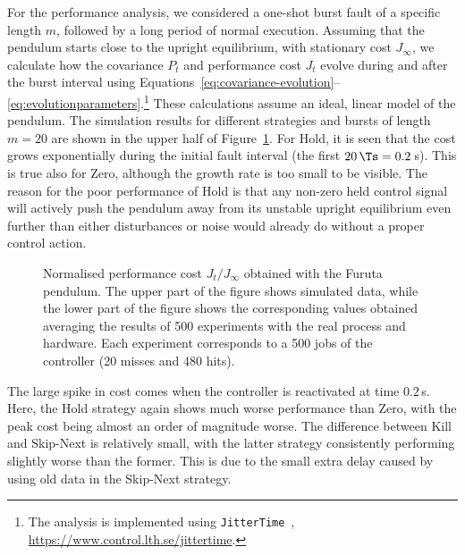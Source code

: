 For the performance analysis, we considered a one-shot burst fault of a specific length $m$, followed by a long period of normal execution. 
Assuming that the pendulum starts close to the upright equilibrium, with stationary cost $J_\infty$, we calculate how the covariance $P_t$ and performance cost $J_t$ evolve during and after the burst interval using Equations~\eqref{eq:covariance-evolution}--\eqref{eq:evolutionparameters}.\footnote{The analysis is implemented using \texttt{JitterTime}~\cite{Cervin:2019}, \url{https://www.control.lth.se/jittertime}.} 
These calculations assume an ideal, linear model of the pendulum. 
The simulation results for different strategies and bursts of length $m=20$ are shown in the upper half of Figure~\ref{fig:cost_simvsreal}. 
For Hold, it is seen that the cost grows exponentially during the initial fault interval (the first $20\,\Ts=0.2\,$s). 
This is true also for Zero, although the growth rate is too small to be visible.
The reason for the poor performance of Hold is that any non-zero held control signal will actively push the pendulum away from its unstable upright equilibrium even further than either disturbances or noise would already do without a proper control action.
%
\begin{figure}
    \centering
    
    \caption{Normalised performance cost $J_t/J_\infty$ obtained with the Furuta pendulum.
        The upper part of the figure shows simulated data, while the lower part of the figure shows the corresponding values obtained averaging the results of 500 experiments with the real process and hardware.
        Each experiment corresponds to a 500 jobs of the controller (20 misses and 480 hits).}
    \label{fig:cost_simvsreal}
\end{figure}


The large spike in cost comes when the controller is reactivated at time $0.2\,$s. 
Here, the Hold strategy again shows much worse performance than Zero, with the peak cost being almost an order of magnitude worse. 
The difference between Kill and Skip-Next is relatively small, with the latter strategy consistently performing slightly worse than the former. 
This is due to the small extra delay caused by using old data in the Skip-Next strategy.

